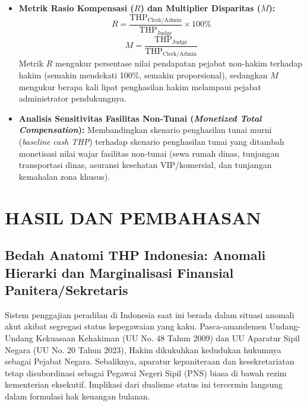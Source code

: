 \documentclass[12pt, a4paper]{article}
\begin{document}
\begin{itemize}
    \item \textbf{Metrik Rasio Kompensasi ($R$) dan Multiplier Disparitas ($M$):}
    \begin{equation}
        R = \frac{\text{THP}_{\text{Clerk/Admin}}}{\text{THP}_{\text{Judge}}} \times 100\%
    \end{equation}
    \begin{equation}
        M = \frac{\text{THP}_{\text{Judge}}}{\text{THP}_{\text{Clerk/Admin}}}
    \end{equation}
    Metrik $R$ mengukur persentase nilai pendapatan pejabat non-hakim terhadap hakim (semakin mendekati 100\%, semakin proporsional), sedangkan $M$ mengukur berapa kali lipat penghasilan hakim melampaui pejabat administrator pendukungnya.
    \item \textbf{Analisis Sensitivitas Fasilitas Non-Tunai (\textit{Monetized Total Compensation}):} Membandingkan skenario penghasilan tunai murni (\textit{baseline cash THP}) terhadap skenario penghasilan tunai yang ditambah monetisasi nilai wajar fasilitas non-tunai (sewa rumah dinas, tunjangan transportasi dinas, asuransi kesehatan VIP/komersial, dan tunjangan kemahalan zona khusus).
\end{itemize}

\section{HASIL DAN PEMBAHASAN}

\subsection{Bedah Anatomi THP Indonesia: Anomali Hierarki dan Marginalisasi Finansial Panitera/Sekretaris}

Sistem penggajian peradilan di Indonesia saat ini berada dalam situasi anomali akut akibat segregasi status kepegawaian yang kaku. Pasca-amandemen Undang-Undang Kekuasaan Kehakiman (UU No. 48 Tahun 2009) dan UU Aparatur Sipil Negara (UU No. 20 Tahun 2023), Hakim dikukuhkan kedudukan hukumnya sebagai Pejabat Negara. Sebaliknya, aparatur kepaniteraan dan kesekretariatan tetap disubordinasi sebagai Pegawai Negeri Sipil (PNS) biasa di bawah rezim kementerian eksekutif. Implikasi dari dualisme status ini tercermin langsung dalam formulasi hak keuangan bulanan.
\end{document}
